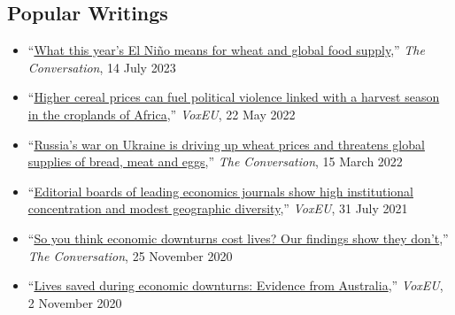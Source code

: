 \documentclass[10pt]{article}
\begin{document}
	\subsection*{Popular Writings}
	\begin{itemize}
		\item ``\href{https://theconversation.com/what-this-years-el-nino-means-for-wheat-and-global-food-supply-209386}{What this year's El Niño means for wheat and global food supply},'' \textit{The Conversation}, 14 July 2023
		\item ``\href{https://voxeu.org/article/rising-cereal-prices-and-political-violence-croplands-africa}{Higher cereal prices can fuel political violence linked with a harvest season in the croplands of Africa},'' \textit{VoxEU}, 22 May 2022
		\item ``\href{https://theconversation.com/russias-war-on-ukraine-is-driving-up-wheat-prices-and-threatens-global-supplies-of-bread-meat-and-eggs-178879}{Russia’s war on Ukraine is driving up wheat prices and threatens global supplies of bread, meat and eggs},'' \textit{The Conversation}, 15 March 2022
		\item ``\href{https://voxeu.org/article/geographic-diversity-economics-journals-editorial-boards}{Editorial boards of leading economics journals show high institutional concentration and modest geographic diversity},'' \textit{VoxEU}, 31 July 2021
		\item ``\href{https://theconversation.com/so-you-think-economic-downturns-cost-lives-our-findings-show-they-dont-149711}{So you think economic downturns cost lives? Our findings show they don't},'' \textit{The Conversation}, 25 November 2020
		\item ``\href{https://voxeu.org/article/lives-saved-during-economic-downturns}{Lives saved during economic downturns: Evidence from Australia},'' \textit{VoxEU}, 2 November 2020
	\end{itemize}
	
\end{document}
